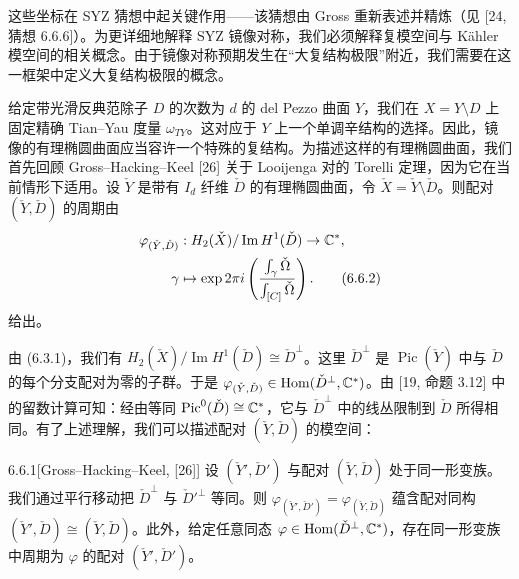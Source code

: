 这些坐标在 SYZ 猜想中起关键作用------该猜想由 Gross 重新表述并精炼（见 [24, 猜想 6.6.6]）。为更详细地解释 SYZ 镜像对称，我们必须解释复模空间与 Kähler 模空间的相关概念。由于镜像对称预期发生在“大复结构极限”附近，我们需要在这一框架中定义大复结构极限的概念。

给定带光滑反典范除子 $D$ 的次数为 $d$ 的 del Pezzo 曲面 $Y$，我们在 $X=Y\setminus D$ 上固定精确 Tian--Yau 度量 $\omega_{TY}$。这对应于 $Y$ 上一个单调辛结构的选择。因此，镜像的有理椭圆曲面应当容许一个特殊的复结构。为描述这样的有理椭圆曲面，我们首先回顾 Gross--Hacking--Keel [26] 关于 Looijenga 对的 Torelli 定理，因为它在当前情形下适用。设 $\check Y$ 是带有 $I_d$ 纤维 $\check D$ 的有理椭圆曲面，令 $\check X=\check Y\setminus\check D$。则配对 $(\check Y,\check D)$ 的周期由
\begin{align}
\varphi_{(\check Y,\check D)}&:H_2(\check X)/\operatorname{Im}H^1(\check D)\to\mathbb{C}^*, \notag\\
\gamma&\mapsto\exp 2\pi i\left(\frac{\int_\gamma\check\Omega}{\int_{[C]}\check\Omega}\right). \tag{6.6.2}
\end{align}
给出。

由 (6.3.1)，我们有 $H_2(\check X)/\operatorname{Im}H^1(\check D)\cong\check D^{\perp}$。这里 $\check D^{\perp}$ 是 $\operatorname{Pic}(\check Y)$ 中与 $\check D$ 的每个分支配对为零的子群。于是 $\varphi_{(\check Y,\check D)}\in\operatorname{Hom}(\check D^{\perp},\mathbb{C}^*)$。由 [19, 命题 3.12] 中的留数计算可知：经由等同 $\operatorname{Pic}^0(\check D)\cong\mathbb{C}^*$，它与 $\check D^{\perp}$ 中的线丛限制到 $\check D$ 所得相同。有了上述理解，我们可以描述配对 $(\check Y,\check D)$ 的模空间：

\begin{theorem}{6.6.1}[{Gross--Hacking--Keel, [26]}]
设 $(\check Y',\check D')$ 与配对 $(\check Y,\check D)$ 处于同一形变族。我们通过平行移动把 $\check D^{\perp}$ 与 $\check D'^{\perp}$ 等同。则 $\varphi_{(\check Y',\check D')}=\varphi_{(\check Y,\check D)}$ 蕴含配对同构 $(\check Y',\check D)\cong(\check Y,\check D)$。此外，给定任意同态 $\varphi\in\operatorname{Hom}(\check D^{\perp},\mathbb{C}^*)$，存在同一形变族中周期为 $\varphi$ 的配对 $(\check Y',\check D')$。
\end{theorem}

